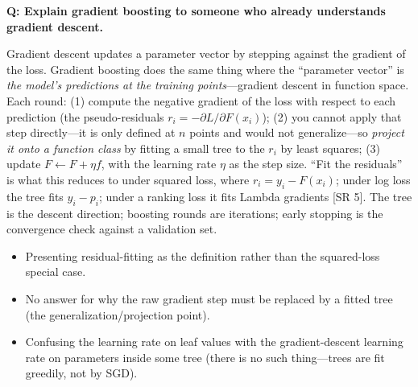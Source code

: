 \begin{interviewq}
\end{interviewq}

\begin{interviewq}
\textbf{Q: Explain gradient boosting to someone who already understands gradient descent.}

 \quad {} \quad \badgefreq{\freqhigh}

\stronganswer

Gradient descent updates a parameter vector by stepping against the gradient of the loss. Gradient boosting does the same thing where the ``parameter vector'' is \textit{the model's predictions at the training points}---gradient descent in function space. Each round: (1) compute the negative gradient of the loss with respect to each prediction (the pseudo-residuals $r_i = -\partial L / \partial F(x_i)$); (2) you cannot apply that step directly---it is only defined at $n$ points and would not generalize---so \textit{project it onto a function class} by fitting a small tree to the $r_i$ by least squares; (3) update $F \leftarrow F + \eta f$, with the learning rate $\eta$ as the step size. ``Fit the residuals'' is what this reduces to under squared loss, where $r_i = y_i - F(x_i)$; under log loss the tree fits $y_i - p_i$; under a ranking loss it fits Lambda gradients [SR 5]. The tree is the descent direction; boosting rounds are iterations; early stopping is the convergence check against a validation set.

\redflags
\begin{itemize}
    \item Presenting residual-fitting as the definition rather than the squared-loss special case.
    \item No answer for why the raw gradient step must be replaced by a fitted tree (the generalization/projection point).
    \item Confusing the learning rate on leaf values with the gradient-descent learning rate on parameters inside some tree (there is no such thing---trees are fit greedily, not by SGD).
\end{itemize}



\end{interviewq}
